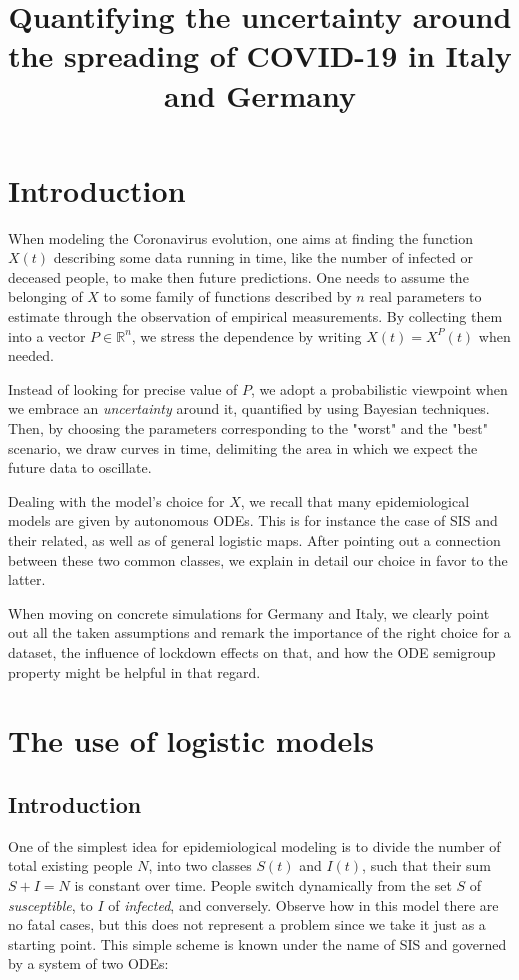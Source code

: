 \documentclass[8pt]{article}
\title {Quantifying the uncertainty around the spreading of COVID-19 in
Italy and Germany}
\begin{document}
\maketitle
\section{Introduction}
When modeling the Coronavirus evolution, one aims at
finding the function $X(t)$ describing some data running in time,
like the number of infected or deceased people, to make then
future predictions.
One needs to assume the belonging of $X$ to some family of functions
described by $n$ real parameters to estimate through 
the observation of empirical measurements.
By collecting them into a vector $P \in \mathbb{R}^n$, 
we stress the dependence by writing $X(t) = X^P(t)$ when needed.


Instead of looking for precise value of $P$, we adopt a probabilistic
viewpoint when we embrace an \emph{uncertainty} around it, quantified
by using Bayesian techniques. Then, by choosing the parameters corresponding
to the "worst" and the "best" scenario, we draw curves in time, delimiting the
area in which we expect the future data to oscillate.


Dealing with the model's choice for $X$, 
we recall that many epidemiological models are given by autonomous ODEs. 
This is for instance the case of
SIS and their related, as well as of general logistic maps.
After pointing out a connection between these two common classes,
we explain in detail our choice in favor to the latter.


When moving on concrete simulations for Germany and Italy,
we clearly point out all the taken assumptions and
remark the importance of the right choice for a dataset,
the influence of lockdown effects on that,
and how the ODE semigroup property might be helpful in that regard.


\section {The use of logistic models}
\subsection {Introduction}
One of the simplest idea for epidemiological modeling is to divide the
number of total existing people $N$, 
into two classes $S(t)$ and $I(t)$, such that
their sum $S + I = N$ is constant over time. People switch dynamically from
the set $S$ of \emph{susceptible}, to $I$ of \emph{infected}, and
conversely. Observe how in this model there are no fatal cases,
but this does not represent a problem since we take it just as a
starting point.
This simple scheme is known under the name of SIS and
governed by a system of two ODEs:
\end{document}
